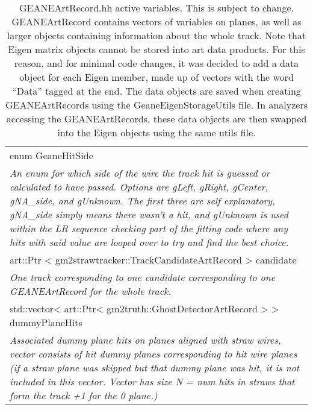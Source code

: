 \begin{longtable}{|p{16cm}|}
\hline

\caption{GEANEArtRecord.hh active variables. This is subject to change. GEANEArtRecord contains vectors of variables on planes, as well as larger objects containing information about the whole track. Note that Eigen matrix objects cannot be stored into art data products. For this reason, and for minimal code changes, it was decided to add a data object for each Eigen member, made up of vectors with the word ``Data'' tagged at the end. The data objects are saved when creating GEANEArtRecords using the GeaneEigenStorageUtils file. In analyzers accessing the GEANEArtRecords, these data objects are then swapped into the Eigen objects using the same utils file.}
 
\label{tab:artRecord}


  \\ \hline

enum GeaneHitSide \\ 
\textit{An enum for which side of the wire the track hit is guessed or calculated to have passed. Options are gLeft, gRight, gCenter, gNA\_side, and gUnknown. The first three are self explanatory, gNA\_side simply means there wasn't a hit, and gUnknown is used within the LR sequence checking part of the fitting code where any hits with said value are looped over to try and find the best choice.}

  \\ \hline

art::Ptr \textless{} gm2strawtracker::TrackCandidateArtRecord \textgreater{} candidate \\
\textit{One track corresponding to one candidate corresponding to one GEANEArtRecord for the whole track.} \\ \hline

std::vector\textless{} art::Ptr\textless{} gm2truth::GhostDetectorArtRecord \textgreater{} \textgreater{} dummyPlaneHits \\
\textit{Associated dummy plane hits on planes aligned with straw wires, vector consists of hit dummy planes corresponding to hit wire planes (if a straw plane was skipped but that dummy plane was hit, it is not included in this vector. Vector has size N = num hits in straws that form the track +1 for the 0 plane.)} \\ \hline


\end{longtable}
